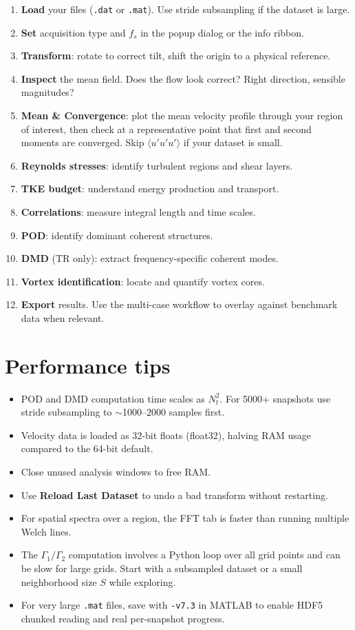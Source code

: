 \documentclass[11pt, a4paper]{report}
\newcommand{\uipth}[1]{\textbf{\textcolor{upblue}{#1}}}
\begin{document}
\begin{enumerate}[leftmargin=1.5em]
  \item \textbf{Load} your files (\texttt{.dat} or \texttt{.mat}). Use stride subsampling if the dataset is large.
  \item \textbf{Set} acquisition type and $f_s$ in the popup dialog or the info ribbon.
  \item \textbf{Transform}: rotate to correct tilt, shift the origin to a physical reference.
  \item \textbf{Inspect} the mean field. Does the flow look correct? Right direction, sensible magnitudes?
  \item \textbf{Mean \& Convergence}: plot the mean velocity profile through your region of interest, then check at a representative point that first and second moments are converged. Skip $\langle u'u'u' \rangle$ if your dataset is small.
  \item \textbf{Reynolds stresses}: identify turbulent regions and shear layers.
  \item \textbf{TKE budget}: understand energy production and transport.
  \item \textbf{Correlations}: measure integral length and time scales.
  \item \textbf{POD}: identify dominant coherent structures.
  \item \textbf{DMD} (TR only): extract frequency-specific coherent modes.
  \item \textbf{Vortex identification}: locate and quantify vortex cores.
  \item \textbf{Export} results. Use the multi-case workflow to overlay against benchmark data when relevant.
\end{enumerate}

\section{Performance tips}

\begin{itemize}[leftmargin=1.5em]
  \item POD and DMD computation time scales as $N_t^2$. For 5000+ snapshots use stride subsampling to $\sim$1000--2000 samples first.
  \item Velocity data is loaded as 32-bit floats (float32), halving RAM usage compared to the 64-bit default.
  \item Close unused analysis windows to free RAM.
  \item Use \uipth{Reload Last Dataset} to undo a bad transform without restarting.
  \item For spatial spectra over a region, the FFT tab is faster than running multiple Welch lines.
  \item The $\Gamma_1/\Gamma_2$ computation involves a Python loop over all grid points and can be slow for large grids. Start with a subsampled dataset or a small neighborhood size $S$ while exploring.
  \item For very large \texttt{.mat} files, save with \texttt{-v7.3} in MATLAB to enable HDF5 chunked reading and real per-snapshot progress.
\end{itemize}
\end{document}
